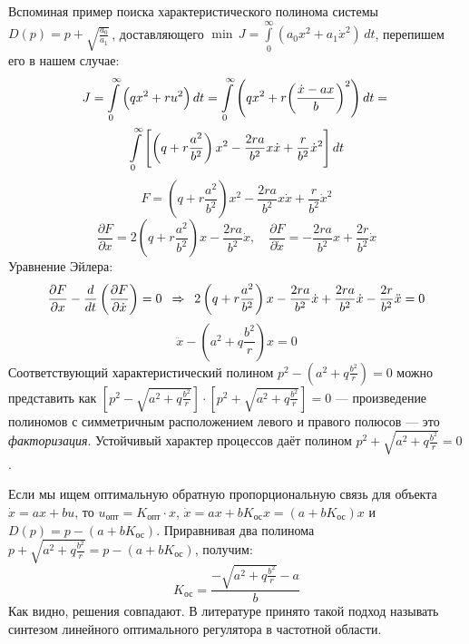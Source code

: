 \documentclass[preprint,russian,a5paper,10pt,twoside,mediummath]{ncc}
\begin{document}
Вспоминая пример поиска характеристического полинома системы $D\left( p \right)=p+\sqrt{\frac{{{a}_{0}}}{{{a}_{1}}}}\,$, доставляющего $\min \, J=\int\limits_{0}^{\infty }{\left( a_0{{x}^{2}}+a_1{{{\dot{x}}}^{2}} \right)} \, dt$, перепишем его в нашем случае:
\begin{multline*}
J = \int\limits_{0}^{\infty }{\Bigl( q{{x}^{2}}+r{{u}^{2}} \Bigr)} \, dt = \int\limits_{0}^{\infty }{\left( q{{x}^{2}}+r{{\left( \frac{\dot{x}-ax}{b} \right)}^{2}} \right)} \, dt ={} \\*
	\int\limits_{0}^{\infty }{ \Biggl[ \left( q+r\frac{{{a}^{2}}}{{{b}^{2}}} \right){{x}^{2}}-\frac{2ra}{{{b}^{2}}}x\dot{x}+\frac{r}{{{b}^{2}}}{{{\dot{x}}}^{2}} \Biggr] } \, dt
\end{multline*}
\[ F=\left( q+r\frac{{{a}^{2}}}{{{b}^{2}}} \right){{x}^{2}}-\frac{2ra}{{{b}^{2}}}x\dot{x}+\frac{r}{{{b}^{2}}}{{\dot{x}}^{2}} \]
\[ \frac{\partial F}{\partial x}=2\left( q+r\frac{{{a}^{2}}}{{{b}^{2}}} \right)x-\frac{2ra}{{{b}^{2}}}\dot{x}, \quad
	\frac{\partial F}{\partial \dot{x}}=-\frac{2ra}{{{b}^{2}}}x+\frac{2r}{{{b}^{2}}}\dot{x} \]
Уравнение Эйлера:
\[ \frac{\partial F}{\partial x}-\frac{d}{dt}\left( \frac{\partial F}{\partial \dot{x}} \right)=0 \enskip \Rightarrow \enskip 2\left( q + r \frac{a^2}{b^2} \right) x - \frac{2ra}{b^2} \dot{x} + \frac{2ra}{b^2} \dot{x} - \frac{2r}{b^2} \ddot{x} = 0 \]
\[ \ddot{x} - \left( a^2 + q \frac{b^2}{r} \right) x = 0 \]
Соответствующий характеристический полином \vspace{1ex} ${{p}^{2}}-\left( {{a}^{2}}+q\frac{{{b}^{2}}}{r} \right)=0$ можно представить как $\left[ p^2 - \sqrt{a^2 + q \frac{b^2}{r}} \right] \cdot \left[ p^2 + \sqrt{a^2 + q \frac{b^2}{r}} \right] = 0 $ \vspace{1ex} --- произведение полиномов с симметричным расположением левого и правого полюсов --- это \textit{факторизация}. Устойчивый характер процессов даёт полином $ p^2 + \sqrt{a^2 + q \frac{b^2}{r}} = 0 $.

Если мы ищем оптимальную обратную пропорциональную связь для объекта $\dot{x}=ax+bu$, то $ u_\textit{опт} = K_\textit{опт} \cdot x $, $\dot{x}=ax+b{{K}_\textit{ос}}x=\left( a+b{{K}_\textit{ос}} \right)x$ и $D\left( p \right)=p-\left( a+b{{K}_\textit{ос}} \right)$. Приравнивая два полинома $p+\sqrt{{{a}^{2}}+q\frac{{{b}^{2}}}{r}}=p-\left( a+b{{K}_\textit{ос}} \right)$, получим:
\[ K_\textit{ос} = \frac{-\sqrt{{{a}^{2}}+q\frac{{{b}^{2}}}{r}}-a}{b} \]
Как видно, решения совпадают. В литературе принято такой подход называть синтезом линейного оптимального регулятора в частотной области.
\end{document}
